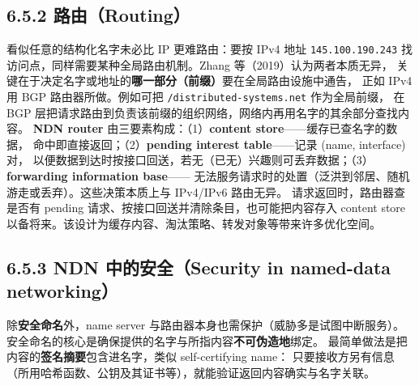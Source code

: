 \subsection*{6.5.2 路由（Routing）}
看似任意的结构化名字未必比 IP 更难路由：要按 IPv4 地址 \texttt{145.100.190.243}
找访问点，同样需要某种全局路由机制。Zhang 等（2019）认为两者本质无异，
关键在于决定名字或地址的\textbf{哪一部分（前缀）}要在全局路由设施中通告，
正如 IPv4 用 BGP 路由器所做。例如可把 \texttt{/distributed-systems.net} 作为全局前缀，
在 BGP 层把请求路由到负责该前缀的组织网络，网络内再用名字的其余部分查找内容。
\textbf{NDN router} 由三要素构成：（1）\textbf{content store}——缓存已查名字的数据，
命中即直接返回；（2）\textbf{pending interest table}——记录 (name, interface) 对，
以便数据到达时按接口回送，若无（已无）兴趣则可丢弃数据；（3）\textbf{forwarding information base}——
无法服务请求时的处置（泛洪到邻居、随机游走或丢弃）。这些决策本质上与 IPv4/IPv6 路由无异。
请求返回时，路由器查是否有 pending 请求、按接口回送并清除条目，也可能把内容存入 content store
以备将来。该设计为缓存内容、淘汰策略、转发对象等带来许多优化空间。

\subsection*{6.5.3 NDN 中的安全（Security in named-data networking）}
除\textbf{安全命名}外，name server 与路由器本身也需保护（威胁多是试图中断服务）。
安全命名的核心是确保提供的名字与所指内容\textbf{不可伪造地}绑定。
最简单做法是把内容的\textbf{签名摘要}包含进名字，类似 self-certifying name：
只要接收方另有信息（所用哈希函数、公钥及其证书等），就能验证返回内容确实与名字关联。

\begin{closeread}
\end{closeread}

